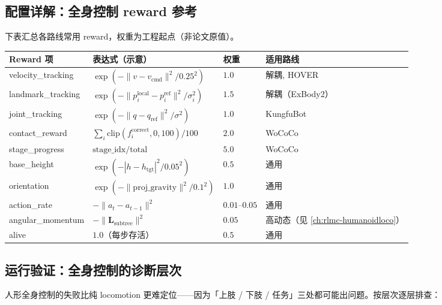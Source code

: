 \subsection{配置详解：全身控制 reward 参考}
下表汇总各路线常用 reward，权重为工程起点（非论文原值）。

\begin{center}
\small
\begin{tabular}{p{2.8cm}p{4.2cm}p{1.4cm}p{2.4cm}}
\hline
Reward 项 & 表达式（示意） & 权重 & 适用路线 \\
\hline
velocity\_tracking & $\exp(-\lVert v - v_{\mathrm{cmd}}\rVert^2/0.25^2)$ & $1.0$ & 解耦, HOVER \\
landmark\_tracking & $\exp(-\lVert p_i^{\mathrm{local}} - p_i^{\mathrm{ref}}\rVert^2/\sigma_i^2)$ & $1.5$ & 解耦（ExBody2） \\
joint\_tracking & $\exp(-\lVert q - q_{\mathrm{ref}}\rVert^2/\sigma^2)$ & $1.0$ & KungfuBot \\
contact\_reward & $\sum_i \mathrm{clip}(f_i^{\mathrm{correct}},0,100)/100$ & $2.0$ & WoCoCo \\
stage\_progress & $\mathrm{stage\_idx}/\mathrm{total}$ & $5.0$ & WoCoCo \\
base\_height & $\exp(-|h - h_{\mathrm{tgt}}|^2/0.05^2)$ & $0.5$ & 通用 \\
orientation & $\exp(-\lVert \mathrm{proj\_gravity}\rVert^2/0.1^2)$ & $1.0$ & 通用 \\
action\_rate & $-\lVert a_t - a_{t-1}\rVert^2$ & $0.01$--$0.05$ & 通用 \\
angular\_momentum & $-\lVert \mathbf{L}_{\mathrm{subtree}}\rVert^2$ & $0.05$ & 高动态（见 \cref{ch:rlmc-humanoidloco}） \\
alive & $1.0$（每步存活） & $0.5$ & 通用 \\
\hline
\end{tabular}
\end{center}


\subsection{运行验证：全身控制的诊断层次}
人形全身控制的失败比纯 locomotion 更难定位——因为「上肢 / 下肢 / 任务」三处都可能出问题。按层次逐层排查：

